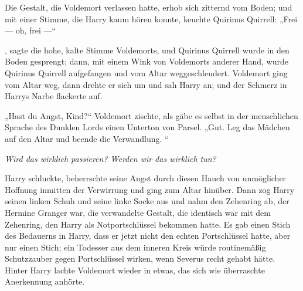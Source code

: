 Die Gestalt, die Voldemort verlassen hatte, erhob sich zitternd vom Boden; und mit einer Stimme, die Harry kaum hören konnte, keuchte Quirinus Quirrell:
„Frei — oh, frei —“

, sagte die hohe, kalte Stimme Voldemorts, und Quirinus Quirrell wurde in den Boden gesprengt; dann, mit einem Wink von Voldemorts anderer Hand, wurde Quirinus Quirrell aufgefangen und vom Altar weggeschleudert.
Voldemort ging vom Altar weg, dann drehte er sich um und sah Harry an; und der Schmerz in Harrys Narbe flackerte auf.

„Hast du Angst, Kind?“ Voldemort zischte, als gäbe es selbst in der menschlichen Sprache des Dunklen Lords einen Unterton von Parsel.
„Gut. Leg das Mädchen auf den Altar und beende die Verwandlung. “

\emph{Wird das wirklich passieren? Werden wir das wirklich tun?}

Harry schluckte, beherrschte seine Angst durch diesen Hauch von unmöglicher Hoffnung inmitten der Verwirrung und ging zum Altar hinüber. Dann zog Harry seinen linken Schuh und seine linke Socke aus und nahm den Zehenring ab, der Hermine Granger war, die verwandelte Gestalt, die identisch war mit dem Zehenring, den Harry als Notportschlüssel bekommen hatte. Es gab einen Stich des Bedauerns in Harry, dass er jetzt nicht den echten Portschlüssel hatte, aber nur einen Stich; ein Todesser aus dem inneren Kreis würde routinemäßig Schutzzauber gegen Portschlüssel wirken, wenn Severus recht gehabt hätte. Hinter Harry lachte Voldemort wieder in etwas, das sich wie überraschte Anerkennung anhörte.

